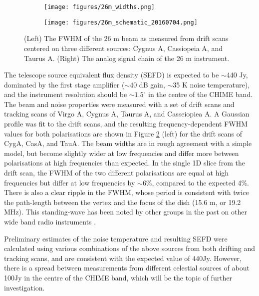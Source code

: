 \begin{figure}[h!] %
	\centering
	\begin{subfigure}[a]{0.42\textwidth}
		\vspace{-4in}
		\texttt{[image: figures/26m\_widths.png]}%
	\end{subfigure}
	\begin{subfigure}[b]{0.56\textwidth}%
		\texttt{[image: figures/26m\_schematic\_20160704.png]}%
		\label{signalchain}
	\end{subfigure}%
	\caption{(Left) The FWHM of the 26 m beam as measured from drift scans centered on three different sources: Cygnus A, Cassiopeia A, and Taurus A. (Right) The analog signal chain of the 26 m instrument.}
	\label{26mplot}
\end{figure}

The telescope source equivalent flux density (SEFD) is expected to be $\sim$440 Jy, dominated by the first stage amplifier ($\sim$40 dB gain, $\sim$35 K noise temperature), and the instrument resolution should be $\sim1.5^{\circ}$ in the centre of the CHIME band. The beam and noise properties were measured with a set of drift scans and tracking scans of Virgo A, Cygnus A, Taurus A, and Casseiopiea A. A Gaussian profile was fit to the drift scans, and the resulting frequency-dependent FWHM values for both polarisations are shown in Figure \ref{26mplot} (left) for the drift scans of CygA, CasA, and TauA. The beam widths are in rough agreement with a simple model, but become slightly wider at low frequencies and differ more between polarisations at high frequencies than expected. In the single 1D slice from the drift scan, the FWHM of the two different polarisations are equal at high frequencies but differ at low frequencies by $\sim$6\%, compared to the expected 4\%. There is also a clear ripple in the FWHM, whose period is consistent with twice the path-length between the vertex and the focus of the dish (15.6 m, or 19.2 MHz). This standing-wave has been noted by other groups in the past on other wide band radio instruments \citep{wander1, wander2}.

Preliminary estimates of the noise temperature and resulting SEFD were calculated using various combinations of the above sources from both drifting and tracking scans, and are consistent with the expected value of 440Jy. However, there is a spread between measurements from different celestial sources of about 100Jy in the centre of the CHIME band, which will be the topic of further investigation.

